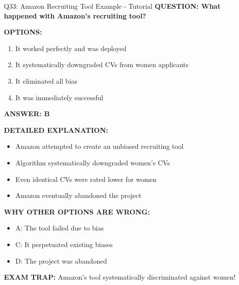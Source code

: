 \documentclass[8pt]{beamer}
\begin{document}
	\begin{frame}{Q33: Amazon Recruiting Tool Example - Tutorial}
		\fontsize{6.5}{7.5}\selectfont
		\textbf{QUESTION: What happened with Amazon's recruiting tool?}
		
		\vspace{0.1cm}
		\textbf{OPTIONS:}
		\begin{enumerate}
			\item It worked perfectly and was deployed
			\item It systematically downgraded CVs from women applicants
			\item It eliminated all bias
			\item It was immediately successful
		\end{enumerate}
		
		\vspace{0.1cm}
		\textcolor{myblue}{\textbf{ANSWER: B}}
		
		\vspace{0.1cm}
		\textbf{DETAILED EXPLANATION:}
		\begin{itemize}
			\item Amazon attempted to create an unbiased recruiting tool
			\item Algorithm systematically downgraded women's CVs
			\item Even identical CVs were rated lower for women
			\item Amazon eventually abandoned the project
		\end{itemize}
		
		\vspace{0.1cm}
		\textcolor{myred}{\textbf{WHY OTHER OPTIONS ARE WRONG:}}
		\begin{itemize}
			\item \textcolor{myred}{A:} The tool failed due to bias
			\item \textcolor{myred}{C:} It perpetuated existing biases
			\item \textcolor{myred}{D:} The project was abandoned
		\end{itemize}
		
		\textcolor{myred}{\textbf{EXAM TRAP:}} Amazon's tool \textcolor{myblue}{systematically discriminated against women}!
	\end{frame}
	
\end{document}
